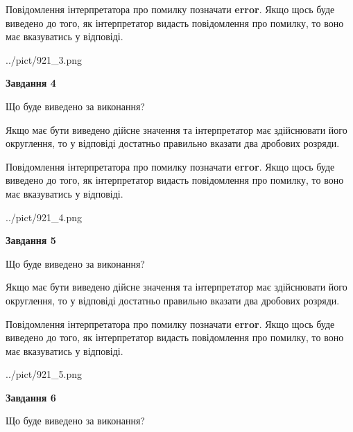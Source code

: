 \documentclass[12pt, ukrainian]{article}
\begin{document}
{\begin {Large}
Повідомлення інтерпретатора про помилку позначати \textbf{error}.
Якщо щось буде виведено до того, як інтерпретатор видасть повідомлення про помилку, 
то воно має вказуватись у відповіді. \par

\begin{center}
	{../pict/921_3.png}
\end{center}
\newpage

{\begin {center}\textbf{Завдання 4}\end {center}}\par
Що буде виведено за виконання? \par

Якщо має бути виведено дійсне значення та інтерпретатор має здійснювати його округлення, 
то у відповіді достатньо правильно вказати два дробових розряди.

Повідомлення інтерпретатора про помилку позначати \textbf{error}.
Якщо щось буде виведено до того, як інтерпретатор видасть повідомлення про помилку, 
то воно має вказуватись у відповіді. \par

\begin{center}
	{../pict/921_4.png}
\end{center}
\newpage

{\begin {center}\textbf{Завдання 5}\end {center}}\par
Що буде виведено за виконання? \par

Якщо має бути виведено дійсне значення та інтерпретатор має здійснювати його округлення, 
то у відповіді достатньо правильно вказати два дробових розряди.

Повідомлення інтерпретатора про помилку позначати \textbf{error}.
Якщо щось буде виведено до того, як інтерпретатор видасть повідомлення про помилку, 
то воно має вказуватись у відповіді. \par

\begin{center}
	{../pict/921_5.png}
\end{center}
\newpage

{\begin {center}\textbf{Завдання 6}\end {center}}\par
Що буде виведено за виконання? \par


\end{Large}}
\end{document}
